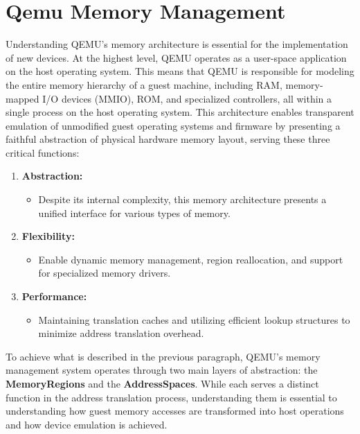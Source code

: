 \section{Qemu Memory Management}
\label{chap:QEMU_Memory}

Understanding QEMU's memory architecture is essential for the implementation 
of new devices. At the highest level, QEMU operates as a user-space application on 
the host operating system. This means that QEMU is responsible for modeling the 
entire memory hierarchy of a guest machine, including RAM, memory-mapped I/O 
devices (MMIO), ROM, and specialized controllers, all within a single process on 
the host operating system. This architecture enables transparent emulation of 
unmodified guest operating systems and firmware by presenting a faithful abstraction 
of physical hardware memory layout, serving these three critical functions:

\begin{enumerate}
    \item \textbf{Abstraction:}     
        \begin{itemize}
            \item Despite its internal complexity, this memory architecture presents a 
            unified interface for various types of memory.
        \end{itemize}
    \item \textbf{Flexibility:} 
        \begin{itemize}
            \item Enable dynamic memory management, region reallocation, and support 
            for specialized memory drivers.
        \end{itemize}
    \item \textbf{Performance:} 
        \begin{itemize}
            \item Maintaining translation caches and utilizing efficient lookup structures to 
            minimize address translation overhead.
        \end{itemize}
\end{enumerate}


To achieve what is described in the previous paragraph, QEMU's memory 
management system operates through two main layers of abstraction: the \textbf{MemoryRegions} 
and the \textbf{AddressSpaces}. While each serves a distinct function in the address 
translation process, understanding them is essential to understanding how guest 
memory accesses are transformed into host operations and how device emulation is 
achieved.

